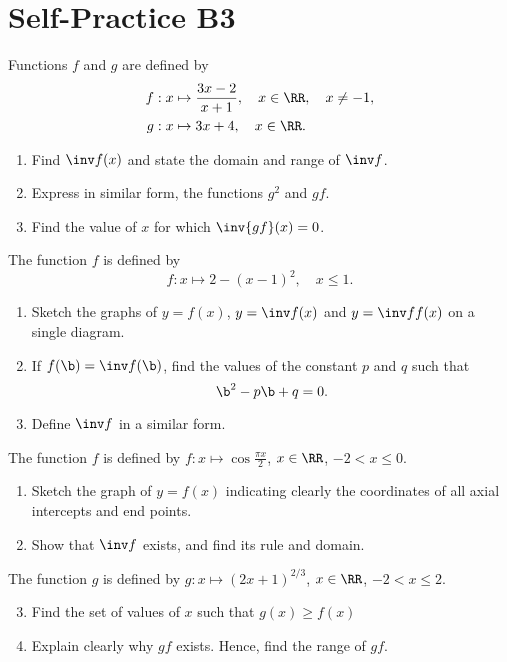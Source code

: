 \section{Self-Practice B3}

\begin{problem}
    Functions $f$ and $g$ are defined by
    \begin{align*}
        f &: x \mapsto \frac{3x-2}{x+1}, \quad x \in \RR, \quad x \neq -1,\\
        g &: x \mapsto 3x + 4, \quad x \in \RR.
    \end{align*}

    \begin{enumerate}
        \item Find $\inv f(x)$ and state the domain and range of $\inv f$.
        \item Express in similar form, the functions $g^2$ and $gf$.
        \item Find the value of $x$ for which $\inv{gf} (x) = 0$.
    \end{enumerate}
\end{problem}

\begin{problem}
    The function $f$ is defined by \[f : x \mapsto 2 - (x-1)^2, \quad x \leq 1.\]

    \begin{enumerate}
        \item Sketch the graphs of $y = f(x)$, $y = \inv f(x)$ and $y = \inv f f(x)$ on a single diagram.
        \item If $f(\b) = \inv f(\b)$, find the values of the constant $p$ and $q$ such that \[\b^2 - p\b + q = 0.\]
        \item Define $\inv f$ in a similar form.   
    \end{enumerate}
\end{problem}

\begin{problem}
    The function $f$ is defined by $f : x \mapsto \cos \frac{\pi x}{2}$, $x \in \RR$, $-2 < x \leq 0$.

    \begin{enumerate}
        \item Sketch the graph of $y=f(x)$ indicating clearly the coordinates of all axial intercepts and end points.
        \item Show that $\inv f$ exists, and find its rule and domain.
    \end{enumerate}

    The function $g$ is defined by $g : x \mapsto (2x+1)^{2/3}$, $x \in \RR$, $-2 < x \leq 2$.

    \begin{enumerate}
        \setcounter{enumi}{2}
        \item Find the set of values of $x$ such that $g(x) \geq f(x)$
        \item Explain clearly why $gf$ exists. Hence, find the range of $gf$.
    \end{enumerate}
\end{problem}

